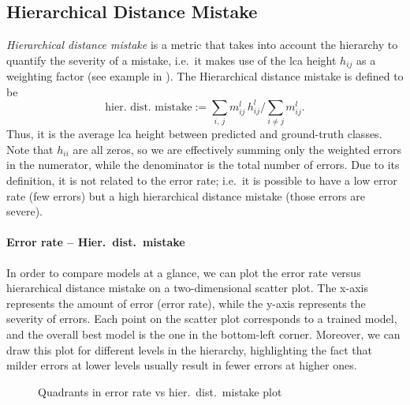 \subsection{Hierarchical Distance Mistake}
\label{subsec:hierarchical-distance-mistake}
\emph{Hierarchical distance mistake} is a metric that takes into account the hierarchy to quantify the severity of a mistake, i.e.\ it makes use of the \acrshort{lca} height $h_{ij}$ as a weighting factor (see example in ).
The Hierarchical distance mistake is defined to be
\begin{equation}
  \textrm{hier.\ dist.\ mistake} :=
  \sum_{i, \, j} m_{ij}^l \, h_{ij}^l \bigg/ \sum_{i \ne j} m_{ij}^l.
  \label{eq:hierarchical-distance-mistake}
\end{equation}
Thus, it is the average \acrshort{lca} height between predicted and ground-truth classes.
Note that $h_{ii}$ are all zeros, so we are effectively summing only the weighted errors in the numerator, while the denominator is the total number of errors. Due to its definition, it is not related to the error rate; i.e.\ it is possible to have a low error rate (few errors) but a high hierarchical distance mistake (those errors are severe).

\paragraph{Error rate -- Hier.\ dist.\ mistake}
\label{par:error-rate-hier-dist-mistake}
In order to compare models at a glance, we can plot the error rate versus hierarchical distance mistake on a two-dimensional scatter plot.
The x-axis represents the amount of error (error rate), while the y-axis represents the severity of errors. Each point on the scatter plot corresponds to a trained model, and the overall best model is the one in the bottom-left corner.
Moreover, we can draw this plot for different levels in the hierarchy, highlighting the fact that milder errors at lower levels usually result in fewer errors at higher ones.
\begin{figure}[htbp]
  \caption{Quadrants in error rate vs hier.\ dist.\ mistake plot}
  \label{fig:04/error-rate-hier-dist-mistake}
\end{figure}

